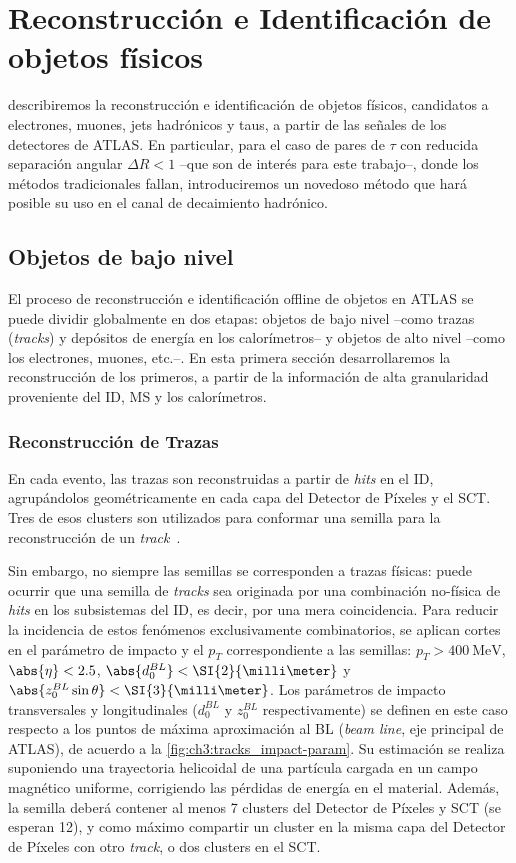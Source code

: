 \chapter{Reconstrucción e Identificación de objetos físicos} \label{chap:ch3}

 describiremos la reconstrucción e identificación de objetos físicos, candidatos a electrones, muones, jets hadrónicos y taus, a partir de las señales de los detectores de ATLAS. En particular, para el caso de pares de $\tau$ con reducida separación angular $\Delta R < 1$ --que son de interés para este trabajo--, donde los métodos tradicionales fallan, introduciremos un novedoso método que hará posible su uso en el canal de decaimiento hadrónico.

\section{Objetos de bajo nivel}

El proceso de reconstrucción e identificación offline de objetos en ATLAS se puede dividir globalmente en dos etapas: objetos de bajo nivel --como trazas (\textit{tracks}) y depósitos de energía en los calorímetros-- y objetos de alto nivel --como los electrones, muones, etc.--. En esta primera sección desarrollaremos la reconstrucción de los primeros, a partir de la información de alta granularidad proveniente del ID, MS y los calorímetros.

\subsection{Reconstrucción de Trazas}

En cada evento, las trazas son reconstruidas a partir de \textit{hits} en el ID, agrupándolos geométricamente en cada capa del Detector de Píxeles y el SCT. Tres de esos clusters son utilizados para conformar una semilla para la reconstrucción de un \textit{track}~\cite{Cornelissen2008a,Cornelissen2008,TheATLASCollaboration2017}.

Sin embargo, no siempre las semillas se corresponden a trazas físicas: puede ocurrir que una semilla de \textit{tracks} sea originada por una combinación no-física de \textit{hits} en los subsistemas del ID, es decir, por una mera coincidencia. Para reducir la incidencia de estos fenómenos exclusivamente combinatorios, se aplican cortes en el parámetro de impacto y el $p_T$ correspondiente a las semillas: $p_T > \SI{400}{\MeV}$, $\abs{\eta} < 2.5$, $\abs{d_0^{BL}} < \SI{2}{\milli\meter}$ y $\abs{z_0^{BL} \sin\theta} < \SI{3}{\milli\meter}$. Los parámetros de impacto transversales y longitudinales ($d_0^{BL}$ y $z_0^{BL}$ respectivamente) se definen en este caso respecto a los puntos de máxima aproximación al BL (\textit{beam line}, eje principal de ATLAS), de acuerdo a la \cref{fig:ch3:tracks_impact-param}. Su estimación se realiza suponiendo una trayectoria helicoidal de una partícula cargada en un campo magnético uniforme, corrigiendo las pérdidas de energía en el material. Además, la semilla deberá contener al menos 7 clusters del Detector de Píxeles y SCT (se esperan 12), y como máximo compartir un cluster en la misma capa del Detector de Píxeles con otro \textit{track}, o dos clusters en el SCT.


